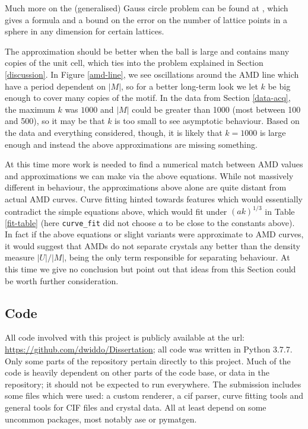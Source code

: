 \documentclass[11pt]{article}
\theoremstyle{definition}
\begin{document}
Much more on the (generalised) Gauss circle problem can be found at \cite{point-dist}, which gives a formula and a bound on the error on the number of lattice points in a sphere in any dimension for certain lattices.

The approximation should be better when the ball is large and contains many copies of the unit cell, which ties into the problem explained in Section \ref{discussion}. In Figure \ref{amd-line}, we see oscillations around the AMD line which have a period dependent on $|M|$, so for a better long-term look we let $k$ be big enough to cover many copies of the motif. In the data from Section \ref{data-acq}, the maximum $k$ was $1000$ and $|M|$ could be greater than 1000 (most between 100 and 500), so it may be that $k$ is too small to see asymptotic behaviour. Based on the data and everything considered, though, it is likely that $k=1000$ is large enough and instead the above approximations are missing something. 

At this time more work is needed to find a numerical match between AMD values and approximations we can make via the above equations. While not massively different in behaviour, the approximations above alone are quite distant from actual AMD curves. Curve fitting hinted towards features which would essentially contradict the simple equations above, which would fit under $(ak)^{1/3}$ in Table \ref{fit-table} (here \texttt{curve\_fit} did not choose $a$ to be close to the constants above). In fact if the above equations or slight variants were approximate to AMD curves, it would suggest that AMDs do not separate crystals any better than the density measure $|U|/|M|$, being the only term responsible for separating behaviour. At this time we give no conclusion but point out that ideas from this Section could be worth further consideration.


\newpage

\printbibliography
 
\begin{appendices}
\section{Code}\label{app1}
All code involved with this project is publicly available at the url: \url{https://github.com/dwiddo/Dissertation}; all code was written in Python 3.7.7. Only some parts of the repository pertain directly to this project. Much of the code is heavily dependent on other parts of the code base, or data in the repository; it should not be expected to run everywhere. The submission includes some files which were used: a custom renderer, a cif parser, curve fitting tools and general tools for CIF files and crystal data. All at least depend on some uncommon packages, most notably ase or pymatgen.

\end{appendices} 
\end{document}
